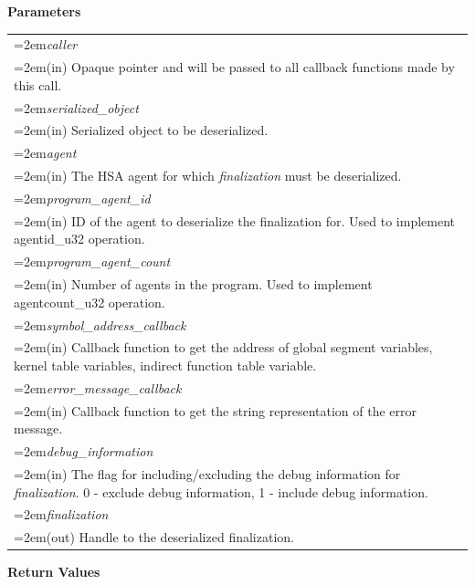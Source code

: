 \documentclass[final,oneside]{book}
\newcommand{\hsaarg}[1]{\textit{#1}}
\begin{document}
\noindent\textbf{Parameters}\\[-6mm]
\noindent\begin{longtable}{@{}>{\hangindent=2em}p{\textwidth}}
\hsaarg{caller}\\\hspace{2em}(in) Opaque pointer and will be passed to all callback functions made by this call.\\[2mm]
\hsaarg{serialized_\-object}\\\hspace{2em}(in) Serialized object to be deserialized.\\[2mm]
\hsaarg{agent}\\\hspace{2em}(in) The HSA agent for which \textit{finalization} must be deserialized.\\[2mm]
\hsaarg{program_\-agent_\-id}\\\hspace{2em}(in) ID of the agent to deserialize the finalization for. Used to implement agentid_\-u32 operation.\\[2mm]
\hsaarg{program_\-agent_\-count}\\\hspace{2em}(in) Number of agents in the program. Used to implement agentcount_\-u32 operation.\\[2mm]
\hsaarg{symbol_\-address_\-callback}\\\hspace{2em}(in) Callback function to get the address of global segment variables, kernel table variables, indirect function table variable.\\[2mm]
\hsaarg{error_\-message_\-callback}\\\hspace{2em}(in) Callback function to get the string representation of the error message.\\[2mm]
\hsaarg{debug_\-information}\\\hspace{2em}(in) The flag for including/excluding the debug information for \textit{finalization}. 0 - exclude debug information, 1 - include debug information.\\[2mm]
\hsaarg{finalization}\\\hspace{2em}(out) Handle to the deserialized finalization.
\end{longtable}
\vspace{-5mm}\noindent\textbf{Return Values}\\[-6mm]
\end{document}
